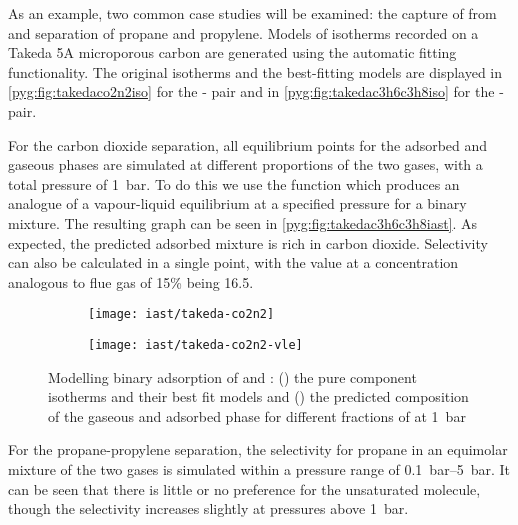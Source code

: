As an example, two common case studies will be examined: the capture of
 from  and separation of propane and propylene.
Models of isotherms recorded on a Takeda 5A microporous carbon are
generated using the automatic fitting functionality. 
The original isotherms and the best-fitting models are displayed in 
\autoref{pyg:fig:takedaco2n2iso} for the - pair and 
in \autoref{pyg:fig:takedac3h6c3h8iso} for the - pair.

For the carbon dioxide separation, all equilibrium
points for the adsorbed and gaseous phases are simulated 
at different proportions of the two gases, with a total pressure
of \SI{1}{\bar}. To do this we use the 
function which produces an analogue of a vapour-liquid equilibrium at 
a specified pressure for a binary mixture. The resulting graph can be seen
in \autoref{pyg:fig:takedac3h6c3h8iast}.
As expected, the predicted adsorbed mixture is rich in carbon dioxide.
Selectivity can also be calculated in a single point, with the value at
a concentration analogous to flue gas of 15\%  being 16.5. 

\begin{figure}[htb]

    \centering
    \begin{subfigure}[b]{.42\textwidth}
        \centering
        \texttt{[image: iast/takeda-co2n2]}
        \caption{}%
        \label{pyg:fig:takedaco2n2iso}
    \end{subfigure}%
    \begin{subfigure}[b]{.4\textwidth}
        \centering
        \texttt{[image: iast/takeda-co2n2-vle]}
        \caption{}%
        \label{pyg:fig:takedaco2n2iast}
    \end{subfigure}
    \caption{
    Modelling binary adsorption of  and : 
    (\protect{}) the pure component
    isotherms and their best fit models and 
    (\protect{}) 
    the predicted composition of the gaseous
    and adsorbed phase for different fractions of 
     at \SI{1}{\bar}
    }%
    \label{pyg:fig:takedaco2n2}

\end{figure}

For the propane-propylene separation, the selectivity for
propane in an equimolar mixture of the two gases is simulated within
a pressure range of \SIrange{0.1}{5}{\bar}. 
It can be seen that there is little or no preference for the 
unsaturated molecule, though the selectivity increases slightly at 
pressures above \SI{1}{\bar}.

